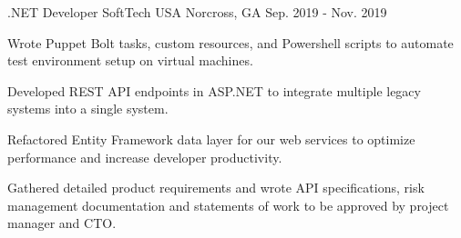 

\begin{cventries}

  \cventry
    {.NET Developer} %
    {SoftTech USA} %
    {Norcross, GA} %
    {Sep. 2019 - Nov. 2019} %
    {
      \begin{cvitems} %
        \item {Wrote Puppet Bolt tasks, custom resources, and Powershell scripts to automate test environment setup on virtual machines.}
        \item {Developed REST API endpoints in ASP.NET to integrate multiple legacy systems into a single system.}
        \item {Refactored Entity Framework data layer for our web services to optimize performance and increase developer productivity.}
        \item {Gathered detailed product requirements and wrote API specifications, risk management documentation and statements of work to be approved by project manager and CTO.}
      \end{cvitems}
    }


\end{cventries}
